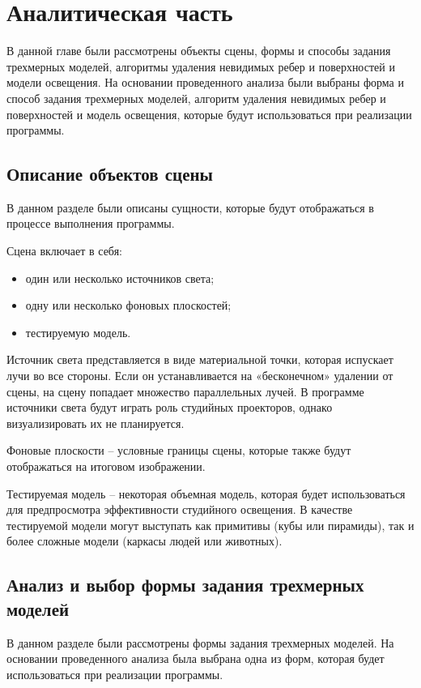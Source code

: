 \chapter{Аналитическая часть}

В данной главе были рассмотрены объекты сцены, формы и способы задания трехмерных моделей, алгоритмы удаления невидимых ребер и поверхностей и модели освещения. На основании проведенного анализа были выбраны форма и способ задания трехмерных моделей, алгоритм удаления невидимых ребер и поверхностей и модель освещения, которые будут использоваться при реализации программы. 

\section{Описание объектов сцены}

В данном разделе были описаны сущности, которые будут отображаться в процессе выполнения программы.


Сцена включает в себя:
\begin{itemize}
	\item один или несколько источников света;
	\item одну или несколько фоновых плоскостей;
	\item тестируемую модель.
\end{itemize}


Источник света представляется в виде материальной точки, которая испускает лучи во все стороны. Если он устанавливается на «бесконечном» удалении от сцены, на сцену попадает множество параллельных лучей. В программе источники света будут играть роль студийных проекторов, однако визуализировать их не планируется.

Фоновые плоскости – условные границы сцены, которые также будут отображаться на итоговом изображении.

Тестируемая модель – некоторая объемная модель, которая будет использоваться для предпросмотра эффективности студийного освещения. В качестве тестируемой модели могут выступать как примитивы (кубы или пирамиды), так и более сложные модели (каркасы людей или животных).

\section{Анализ и выбор формы задания трехмерных моделей}

В данном разделе были рассмотрены формы задания трехмерных моделей. На основании проведенного анализа была выбрана одна из форм, которая будет использоваться при реализации программы.

